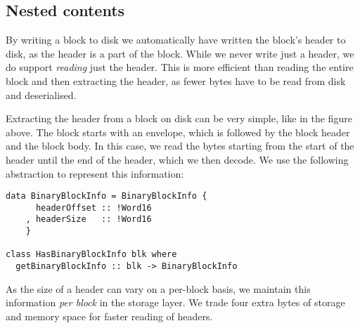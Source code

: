\subsection{Nested contents}
\label{serialisation:storage:nested-contents}

By writing a block to disk we automatically have written the block's header to
disk, as the header is a part of the block. While we never write just a header,
we do support \emph{reading} just the header. This is more efficient than
reading the entire block and then extracting the header, as fewer bytes have to
be read from disk and deserialised.

\begin{center}
\end{center}

Extracting the header from a block on disk can be very simple, like in the
figure above. The block starts with an envelope, which is followed by the block
header and the block body. In this case, we read the bytes starting from the
start of the header until the end of the header, which we then decode. We use
the following abstraction to represent this information:

\begin{lstlisting}
data BinaryBlockInfo = BinaryBlockInfo {
      headerOffset :: !Word16
    , headerSize   :: !Word16
    }

class HasBinaryBlockInfo blk where
  getBinaryBlockInfo :: blk -> BinaryBlockInfo
\end{lstlisting}

As the size of a header can vary on a per-block basis, we maintain this
information \emph{per block} in the storage layer. We trade four
extra bytes of storage and memory space for faster reading of headers.

